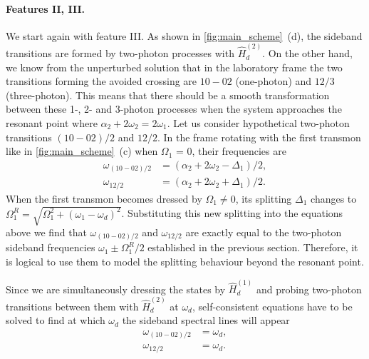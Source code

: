 \documentclass[%
 aps, prx,
 amsmath,amssymb,
 reprint,%
superscriptaddress
]{revtex4-2}
\begin{document}
\paragraph{Features II, III.} We start again with feature III. As shown in 
\autoref{fig:main_scheme}~(d), the sideband 
transitions are formed by two-photon processes 
with $\hat H_d^{(2)}$. On the other hand, we know from 
the unperturbed solution that in the laboratory 
frame the two transitions forming the avoided 
crossing are $10 - 02$ (one-photon) and $12/3$ 
(three-photon). This means that there should be a 
smooth transformation between these 1-, 2- and 3-photon 
processes when the system approaches the resonant 
point where $\alpha_2 + 2 \omega_{2} = 2\omega_1$. Let us consider hypothetical two-photon transitions $(10 
- 02)/2$ and $12/2$. In the frame rotating with 
the first transmon like in 
\autoref{fig:main_scheme}~(c) when $\Omega_1$ = 
0, their 
frequencies are
\begin{equation}
\begin{aligned}
\omega_{(10-02)/2} &= (\alpha_2 + 2 \omega_{2} - \Delta_1)/2,\\
 \omega_{12/2} &= (\alpha_2 + 2 \omega_{2} + \Delta_1)/2.
\end{aligned}
\label{eq:two-photon_lab}
\end{equation}
When the first transmon becomes dressed by $\Omega_1 \neq 0$, its splitting $\Delta_1$ changes to $\Omega^R_1 =\sqrt{\Omega_{1}^2 + \left(\omega_{1} - \omega_{d}\right)^{2}}$. Substituting this new splitting into the equations above we find that $\omega_{(10-02)/2}$ and $\omega_{12/2}$ are exactly equal to the two-photon sideband frequencies $\omega_1 \pm \Omega_1^R/2$ established in the previous section. Therefore, it is logical to use them to model the splitting behaviour beyond the resonant point.

Since we are simultaneously dressing the states by $\hat H_d^{(1)}$ and probing two-photon transitions between them with $\hat H_d^{(2)}$ at $\omega_d$, self-consistent equations have to be solved to find at which $\omega_d$ the sideband spectral lines will appear
\begin{equation}
\begin{aligned}
\omega_{(10-02)/2} &= \omega_d,\\
\omega_{12/2} &= \omega_d.
\end{aligned}
\label{eq:two-photon}
\end{equation}
\end{document}
